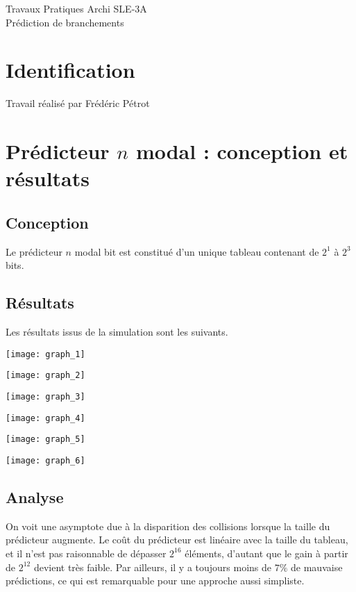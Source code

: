 \documentclass[a4paper]{article}
\begin{document}
\begin{center}
\large
Travaux Pratiques Archi SLE-3A\\
\LARGE
Prédiction de branchements\\
\large

\end{center}
\section{Identification}
Travail réalisé par Frédéric Pétrot

\section{Prédicteur $n$ modal : conception et résultats}
\subsection{Conception}
Le prédicteur $n$ modal bit est constitué d'un unique tableau contenant de $2^1$ à $2^3$ bits.

\subsection{Résultats}
Les résultats issus de la simulation sont les suivants.
\par
\begin{minipage}{.48\linewidth}
\texttt{[image: graph\_1]}
\end{minipage}%
\hfill
\begin{minipage}{.48\linewidth}
\texttt{[image: graph\_2]}
\end{minipage}

\begin{minipage}{.48\linewidth}
\texttt{[image: graph\_3]}
\end{minipage}%
\hfill
\begin{minipage}{.48\linewidth}
\texttt{[image: graph\_4]}
\end{minipage}

\begin{minipage}{.48\linewidth}
\texttt{[image: graph\_5]}
\end{minipage}%
\hfill
\begin{minipage}{.48\linewidth}
\texttt{[image: graph\_6]}
\end{minipage}
\subsection{Analyse}
On voit une asymptote due à la disparition des collisions lorsque la taille du prédicteur augmente.
Le coût du prédicteur est linéaire avec la taille du tableau, et il n'est pas raisonnable de dépasser $2^{16}$ éléments, d'autant que le gain à partir de $2^{12}$ devient très faible.
Par ailleurs, il y a toujours moins de $7\%$ de mauvaise prédictions, ce qui est remarquable pour une approche aussi simpliste.
\end{document}
